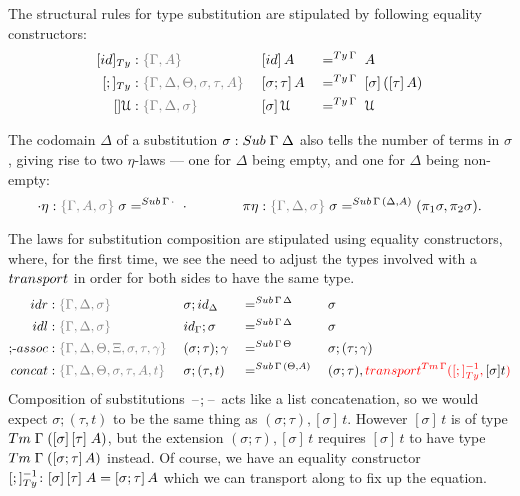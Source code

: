 \documentclass[a4paper,UKenglish,numberwithinsect,cleveref,thm-restate]{lipics-v2021}
\begin{document}
The structural rules for type substitution are stipulated by following equality constructors:
\begin{alignat*}{3}
  [\idS]_{\Ty} & : \implicit{\Gamma, A}                               && [ \idS ] \,A           && =^{\Ty\,\Gamma}\;A \\
  [;]_{\Ty}    & : \implicit{\Gamma, \Delta, \Theta, \sigma, \tau, A}\;&& [ \sigma ; \tau ]\,A  && =^{\Ty\,\Gamma}\;[ \sigma ]\,([ \tau ]\,A) \\
  []\UU      & : \implicit{\Gamma, \Delta, \sigma}                    && [ \sigma ]\,\UU        && =^{\Ty\,\Gamma}\;\UU
\end{alignat*}

The codomain $\Delta$ of a substitution $\sigma:\Sub\;\Gamma\;\Delta$ also tells the number of terms in $\sigma$, giving rise to two $\eta$-laws --- one for $\Delta$ being empty, and one for $\Delta$ being non-empty:
\[
  \emptyctx\eta : \implicit{\Gamma, A, \sigma}\; \sigma        =^{\Sub\,\Gamma\,\emptyctx} \; \emptysub
  \qquad\qquad
  \pi\eta       : \implicit{\Gamma, \Delta, \sigma}\; \sigma   =^{\Sub\,\Gamma\,(\Delta, A)} (\pi_1 \sigma, \pi_2 \sigma).
\]

The laws for substitution composition are stipulated using equality constructors, where, for the first time, we see the need to adjust the types involved with a $\transp$ in order for both sides to have the same type.
\begin{alignat*}{5}
  \mathsf{idr}    & : \implicit{\Gamma, \Delta, \sigma} && {\sigma ; \idS_{\Delta}} && =^{\Sub\,\Gamma\,\Delta} && {\sigma} \\
  \mathsf{idl}    & : \implicit{\Gamma, \Delta, \sigma} && {\idS_{\Gamma} ; \sigma} && =^{\Sub\,\Gamma\,\Delta} && {\sigma} \\
  \text{;-}\mathsf{assoc} & : \implicit{\Gamma, \Delta, \Theta, \Xi, \sigma, \tau, \gamma}\; && (\sigma ; \tau) ; \gamma && =^{\Sub\,\Gamma\,\Theta} &&  \sigma ; (\tau ; \gamma) \\
  \mathsf{concat} & : \implicit{\Gamma, \Delta, \Theta, \sigma, \tau, A, t} \; && \sigma ; (\tau , t)      && =^{\Sub\,\Gamma\,(\Theta, A)} \; &&  (\sigma ; \tau) , \alert{\transfib{\Tm\,\Gamma}{[;]_{\Ty}^{-1}}{\color{black}[ \sigma ] t}}
\end{alignat*}
%
Composition of substitutions $\mathord{\hspace{1pt}\text{--}\hspace{1pt}};\mathord{\hspace{1pt}\text{--}\hspace{1pt}}$ acts like a list concatenation, so
we would expect $\sigma; (\tau, t)$ to be the same thing as $(\sigma; \tau), [\sigma]\,t$. However $[\sigma]\,t$ is of type $\Tm\;\Gamma\;([\sigma]\,[\tau]\;A)$, but the extension $(\sigma; \tau), [\sigma]\,t$ requires $[\sigma]\,t$ to have type $\Tm\;\Gamma\;([\sigma; \tau]\,A)$ instead. Of course, we have an equality constructor $[;]_{\Ty}^{-1}\colon [\sigma]\,[\tau]\;A = [\sigma;\tau]\,A$ which we can transport along to fix up the equation.
\end{document}
